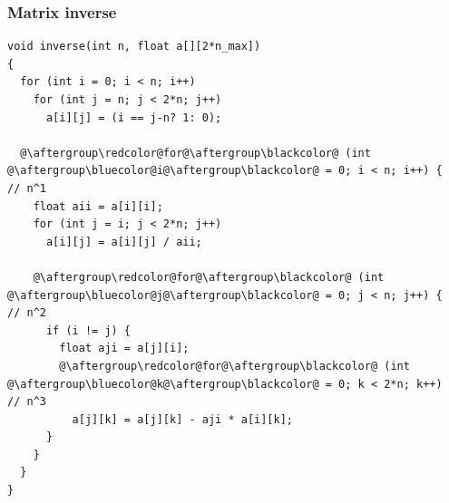 \documentclass[xcolor=dvipsnames]{beamer}
\begin{document}
\begin{frame}[fragile]
  \frametitle{Matrix inverse}
\begin{lstlisting}[basicstyle=\tiny\ttfamily]
void inverse(int n, float a[][2*n_max])
{
  for (int i = 0; i < n; i++)
    for (int j = n; j < 2*n; j++)
      a[i][j] = (i == j-n? 1: 0);

  @\aftergroup\redcolor@for@\aftergroup\blackcolor@ (int @\aftergroup\bluecolor@i@\aftergroup\blackcolor@ = 0; i < n; i++) {         // n^1
    float aii = a[i][i];
    for (int j = i; j < 2*n; j++)
      a[i][j] = a[i][j] / aii;

    @\aftergroup\redcolor@for@\aftergroup\blackcolor@ (int @\aftergroup\bluecolor@j@\aftergroup\blackcolor@ = 0; j < n; j++) {       // n^2
      if (i != j) {
        float aji = a[j][i];
        @\aftergroup\redcolor@for@\aftergroup\blackcolor@ (int @\aftergroup\bluecolor@k@\aftergroup\blackcolor@ = 0; k < 2*n; k++)   // n^3
          a[j][k] = a[j][k] - aji * a[i][k];
      }
    }
  }
}
\end{lstlisting}
\end{frame}
\end{document}
